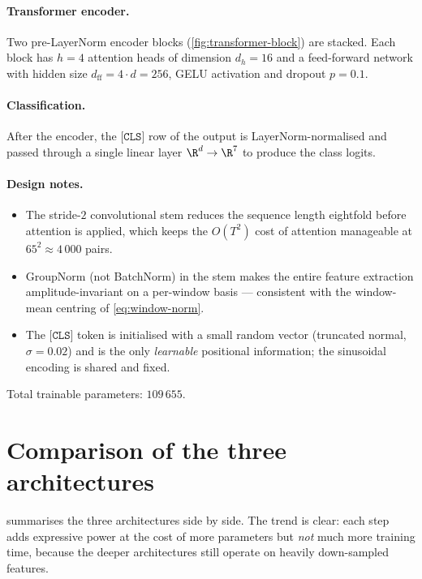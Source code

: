 \paragraph{Transformer encoder.}
Two pre-LayerNorm encoder blocks (\cref{fig:transformer-block}) are
stacked. Each block has $h=4$ attention heads of dimension $d_h = 16$
and a feed-forward network with hidden size
$d_{\mathrm{ff}} = 4 \cdot d = 256$, GELU activation and dropout
$p=0.1$.

\paragraph{Classification.}
After the encoder, the $\texttt{[CLS]}$ row of the output is
LayerNorm-normalised and passed through a single linear layer
$\R^{d} \to \R^{7}$ to produce the class logits.

\paragraph{Design notes.}
\begin{itemize}[leftmargin=*, itemsep=0.2em]
    \item The stride-$2$ convolutional stem reduces the sequence length
    eightfold before attention is applied, which keeps the
    $O(T^2)$ cost of attention manageable at $65^2 \approx 4\,000$
    pairs.
    \item GroupNorm (not BatchNorm) in the stem makes the entire
    feature extraction amplitude-invariant on a per-window basis ---
    consistent with the window-mean centring of \cref{eq:window-norm}.
    \item The $\texttt{[CLS]}$ token is initialised with a small random
    vector (truncated normal, $\sigma = 0.02$) and is the only
    \emph{learnable} positional information; the sinusoidal
    encoding is shared and fixed.
\end{itemize}

Total trainable parameters: $109\,655$.

\section{Comparison of the three architectures}
\label{sec:archi-compare}

 summarises the three architectures side by
side. The trend is clear: each step adds expressive power at the cost
of more parameters but \emph{not} much more training time, because the
deeper architectures still operate on heavily down-sampled features.

